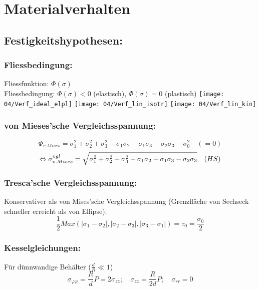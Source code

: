 \section{Materialverhalten}{}
    \subsection{Festigkeitshypothesen:}
        \subsubsection{Fliessbedingung:}
            Fliessfunktion: $\Phi(\sigma)$\\
            Fliessbedingung: $\Phi(\sigma)<0$ (elastisch), $\Phi(\sigma)=0$ (plastisch)
            \texttt{[image: 04/Verf\_ideal\_elpl]}
            \texttt{[image: 04/Verf\_lin\_isotr]}
            \texttt{[image: 04/Verf\_lin\_kin]}
            
        \subsubsection{von Mieses'sche Vergleichsspannung:}
            \[\Phi_{v.Mises}= \sigma_1^2+\sigma_2^2+\sigma_3^2-\sigma_1\sigma_2-\sigma_1\sigma_3-\sigma_2\sigma_3 -\sigma_0^2\quad(=0)\]
            \[\Leftrightarrow \sigma_{v. Mises}^{vgl}= \sqrt{\sigma_1^2+\sigma_2^2+\sigma_3^2-\sigma_1\sigma_2-\sigma_1\sigma_3-\sigma_2\sigma_3} \quad\textrm(HS)\]
            
        \subsubsection{Tresca'sche Vergleichsspannung:}
            Konservativer als von Mises'sche Vergleichsspannung (Grenzfläche von Sechseck schneller erreicht als von Ellipse).
            \[\frac{1}{2}Max(|\sigma_1-\sigma_2|,|\sigma_2-\sigma_3|,|\sigma_3-\sigma_1|)=\tau_0=\frac{\sigma_0}{2}\]
        
        \subsubsection{Kesselgleichungen:}
            Für dünnwandige Behälter ($\frac{d}{R} \ll 1$)
            \[\sigma_{\varphi\varphi} = \frac{R}{d}P = 2\sigma_{zz}; \quad \sigma_{zz} = \frac{R}{2d}P; \quad \sigma_{rr}=0\]
            
